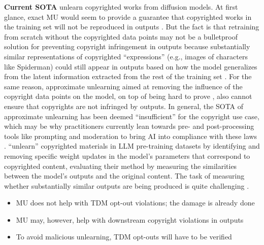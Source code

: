 \textbf{Current SOTA}
\citet{wu2024unlearningconceptsdiffusionmodel} unlearn copyrighted works from diffusion models.
At first glance, exact MU would seem to provide a guarantee that copyrighted works in the training set will not be reproduced in outputs \cite{liu_unlearning_2023}. But the fact is that retraining from scratch without the copyrighted data points may not be a bulletproof solution for preventing copyright infringement in outputs because substantially similar representations of copyrighted ``expressions'' (e.g., images of characters like Spiderman) could still appear in outputs based on how the model generalizes from the latent information extracted from the rest of the training set \citet{cooper2024machineunlearningdoesntthink}. For the same reason, approximate unlearning aimed at removing the influence of the copyright data points on the model, on top of being hard to prove \citep{liu_unlearning_2023},  also cannot ensure that copyrights are not infringed by outputs. In general, the SOTA of approximate unlearning has been deemed ``insufficient'' for the copyright use case, which may be why practitioners currently lean towards pre- and post-processing tools like prompting and moderation to bring AI into compliance with these laws \citep{liu_unlearning_2023, shumailov2024ununlearningunlearningsufficientcontent}.
\citep{dou2024avoidingcopyrightinfringementlarge} ``unlearn'' copyrighted materials in LLM pre-training datasets by identifying and removing specific weight updates in the model’s parameters that correspond to copyrighted content, evaluating their method by measuring the similarities between the model’s outputs
and the original content.
The task of measuring whether substantially similar outputs are being produced is quite challenging \citep{cooper2024machineunlearningdoesntthink}.


\begin{tcolorbox}[colback=green!10,colframe=black!50,title=Key Points]
\begin{itemize}[leftmargin=0pt]
    \item MU does not help with TDM opt-out violations; the damage is already done
    \item MU may, however, help with downstream copyright violations in outputs
    \item To avoid malicious unlearning, TDM opt-outs will have to be verified 
\end{itemize}
\end{tcolorbox}

